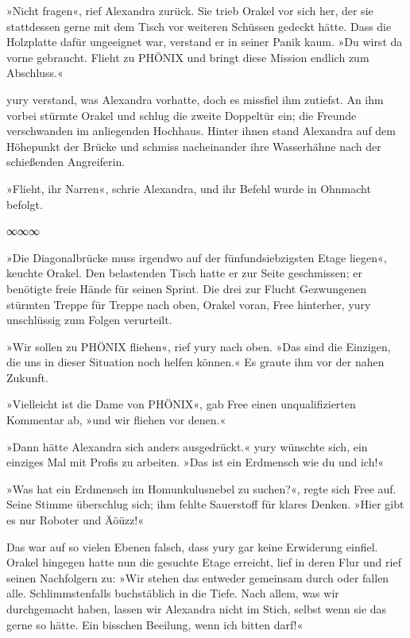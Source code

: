 »Nicht fragen«, rief Alexandra zurück. Sie trieb Orakel vor sich her, der sie stattdessen gerne mit dem Tisch vor weiteren Schüssen gedeckt hätte. Dass die Holzplatte dafür ungeeignet war, verstand er in seiner Panik kaum. »Du wirst da vorne gebraucht. Flieht zu PHÖNIX und bringt diese Mission endlich zum Abschluss.«

yury verstand, was Alexandra vorhatte, doch es missfiel ihm zutiefst. An ihm vorbei stürmte Orakel und schlug die zweite Doppeltür ein; die Freunde verschwanden im anliegenden Hochhaus. Hinter ihnen stand Alexandra auf dem Höhepunkt der Brücke und schmiss nacheinander ihre Wasserhähne nach der schießenden Angreiferin.

»Flieht, ihr Narren«, schrie Alexandra, und ihr Befehl wurde in Ohnmacht befolgt.

\begin{center}
∞∞∞
\end{center}

»Die Diagonalbrücke muss irgendwo auf der fünfundsiebzigsten Etage liegen«, keuchte Orakel. Den belastenden Tisch hatte er zur Seite geschmissen; er benötigte freie Hände für seinen Sprint. Die drei zur Flucht Gezwungenen stürmten Treppe für Treppe nach oben, Orakel voran, Free hinterher, yury unschlüssig zum Folgen verurteilt.

»Wir sollen zu PHÖNIX fliehen«, rief yury nach oben. »Das sind die Einzigen, die uns in dieser Situation noch helfen können.« Es graute ihm vor der nahen Zukunft.

»Vielleicht ist die Dame von PHÖNIX«, gab Free einen unqualifizierten Kommentar ab, »und wir fliehen vor denen.«

»Dann hätte Alexandra sich anders ausgedrückt.« yury wünschte sich, ein einziges Mal mit Profis zu arbeiten. »Das ist ein Erdmensch wie du und ich!«

»Was hat ein Erdmensch im Homunkulusnebel zu suchen?«, regte sich Free auf.  Seine Stimme überschlug sich; ihm fehlte Sauerstoff für klares Denken. »Hier gibt es nur Roboter und Äöüzz!«

Das war auf so vielen Ebenen falsch, dass yury gar keine Erwiderung einfiel. Orakel hingegen hatte nun die gesuchte Etage erreicht, lief in deren Flur und rief seinen Nachfolgern zu: »Wir stehen das entweder gemeinsam durch oder fallen alle. Schlimmstenfalls buchstäblich in die Tiefe. Nach allem, was wir durchgemacht haben, lassen wir Alexandra nicht im Stich, selbst wenn sie das gerne so hätte. Ein bisschen Beeilung, wenn ich bitten darf!«

